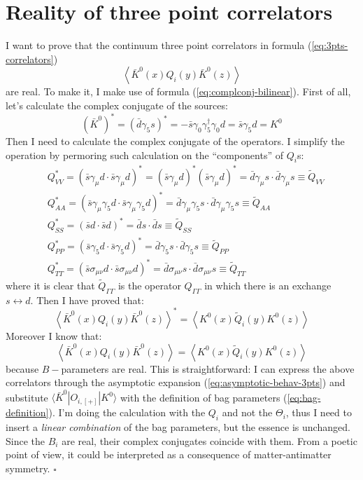 \documentclass[english, LaM, oneside, noexaminfo]{sapthesis}
\newcommand{\la}{\langle}
\newcommand{\ra}{\rangle}
\newcommand{\proved}{\newline \hspace*{.97\textwidth} $\square$}
\begin{document}
\section{Reality of three point correlators}\label{app:proof-reality-3pts}
\noindent
I want to prove that the continuum three point correlators in formula (\ref{eq:3pts-correlators})
$$ \left\la \bar K^0 (x) Q_i (y) \bar K^0 (z) \right\ra $$
are real. To make it, I make use of formula (\ref{eq:complconj-bilinear}).
First of all, let's calculate the complex conjugate of the sources: 
\begin{equation*}
    (\bar K^{0})^* = (\bar d \gamma_5 s)^* = - \bar s \gamma_0 \gamma_5^\dagger \gamma_0 d = \bar s  \gamma_5 d = K^0
\end{equation*}
Then I need to calculate the complex conjugate of the operators.
I simplify the operation by permoring such calculation on the ``components'' of $Q_i$s:
\begin{equation*}
    \begin{aligned}
        & Q_{VV}^* = \left(\bar s \gamma_\mu d \cdot \bar s \gamma_\mu d\right)^* = \left(\bar s \gamma_\mu d\right)^* \left(\bar s \gamma_\mu d\right)^* = \bar d \gamma_\mu s \cdot \bar d \gamma_\mu s \equiv \tilde{Q}_{VV} \\
        & Q_{AA}^* = \left(\bar s \gamma_\mu \gamma_5 d \cdot \bar s \gamma_\mu \gamma_5 d\right)^* = \bar d \gamma_\mu\gamma_5 s \cdot \bar d \gamma_\mu\gamma_5 s \equiv \tilde{Q}_{AA} \\
        & Q_{SS}^* = \left(\bar s  d \cdot \bar s d\right)^* = \bar d  s \cdot \bar d s \equiv \tilde{Q}_{SS} \\
        & Q_{PP}^* = \left(\bar s \gamma_5 d \cdot \bar s \gamma_5 d\right)^* = \bar d \gamma_5 s \cdot \bar d \gamma_5 s \equiv \tilde{Q}_{PP} \\
        & Q_{TT}^* = \left(\bar s \sigma_{\mu\nu} d \cdot \bar s \sigma_{\mu\nu} d\right)^* = \bar d \sigma_{\mu\nu} s \cdot \bar d \sigma_{\mu\nu} s \equiv \tilde{Q}_{TT}
    \end{aligned}
\end{equation*}
where it is clear that $\tilde Q_{\Gamma\Gamma}$ is the operator $Q_{\Gamma\Gamma}$ in which there is an exchange $s \leftrightarrow d$.
Then I have proved that:
$$ \left\la \bar K^0 (x) Q_i (y) \bar K^0 (z) \right\ra^* = \left\la  K^0 (x) \tilde{Q}_i (y) K^0 (z) \right\ra $$
Moreover I know that:
$$ \left\la \bar K^0 (x) Q_i (y) \bar K^0 (z) \right\ra = \left\la  K^0 (x) \tilde{Q}_i (y) K^0 (z) \right\ra $$
because $B-$parameters are real.
This is straightforward: I can express the above correlators through the asymptotic expansion (\ref{eq:asymptotic-behav-3pts}) and substitute $\la \bar K^0 | O_{i,[+]} | K^0 \ra$ with the definition of bag parameters (\ref{eq:bag-definition}).
I'm doing the calculation with the $Q_i$ and not the $\Theta_i$, thus I need to insert a {\it linear combination} of the bag parameters, but the essence is unchanged.
Since the $B_i$ are real, their complex conjugates coincide with them.
From a poetic point of view, it could be interpreted as a consequence of matter-antimatter symmetry. 
\proved
\end{document}

